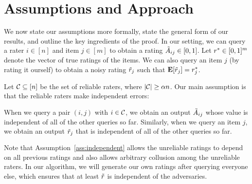 \section{Assumptions and Approach}
\vskip -0.08in
\label{sec:assumptions}
\label{sec:approach}

We now state our assumptions more formally, state the general form 
of our results, and outline the key ingredients of the proof.
In our setting, we can query a rater $i \in [n]$ and item $j \in [m]$ to 
obtain a rating $\tilde{A}_{ij} \in [0,1]$. Let 
$r^* \in [0,1]^m$ denote the vector of true ratings of the items. 
We can also query an item $j$ (by rating it ourself) to obtain a noisy 
rating $\tilde{r}_j$ such that $\mathbf{E}[\tilde{r}_j] = r^*_j$.

Let $\mathcal{C} \subseteq [n]$ be the set of reliable raters, where $|\mathcal{C}| \geq \alpha n$.
Our main assumption is that the reliable raters make independent errors:
\begin{assumption}[Independence]
\label{ass:independent}
When we query a pair $(i,j)$ with $i \in \mathcal{C}$, we obtain an output 
$\tilde{A}_{ij}$ whose value is independent of all of the other queries so far.
Similarly, when we query an item $j$, we obtain an output $\tilde{r}_j$ that 
is independent of all of the other queries so far.
\end{assumption}
Note that Assumption~\ref{ass:independent} allows the unreliable ratings to 
depend on all previous ratings and also allows arbitrary collusion 
among the unreliable raters. 
In our algorithm, we will generate our own ratings after querying everyone 
else, which ensures that at least $\tilde{r}$ is independent of the adversaries.

